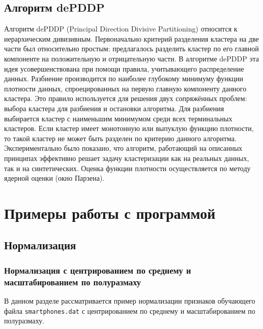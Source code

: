 \documentclass[12pt,tikz]{instruction}
\begin{document}
\subsection{Алгоритм dePDDP} 
Алгоритм dePDDP (Principal Direction Divisive Partitioning) относится к иерархическим дивизивным. Первоначально критерий разделения кластера на две части был относительно простым: предлагалось разделить кластер по его главной компоненте на положительную и отрицательную части. В алгоритме dePDDP эта идея усовершенствована при помощи правила, учитывающего распределение данных. Разбиение производится по наиболее глубокому минимуму функции плотности данных, спроецированных на первую главную компоненту данного кластера. Это правило используется для решения двух сопряжённых проблем: выбора кластера для разбиения и остановки алгоритма. Для разбиения выбирается кластер с наименьшим минимумом среди всех терминальных кластеров. Если кластер имеет монотонную или выпуклую функцию плотности, то такой кластер не может быть разделен по критерию данного алгоритма. Экспериментально было показано, что алгоритм, работающий на описанных принципах эффективно решает задачу кластеризации как на реальных данных, так и на 
синтетических. Оценка функции плотности осуществляется по методу ядерной оценки (окно Парзена).


\section{Примеры работы с программой}
\subsection{Нормализация}
\subsubsection{Нормализация с центрированием по среднему и масштабированием по полуразмаху}
\label{subsubseq:example_norm1}

В данном разделе рассматривается пример нормализации признаков обучающего файла \texttt{smartphones.dat} с центрированием по среднему и масштабированием по полуразмаху. 
\end{document}
